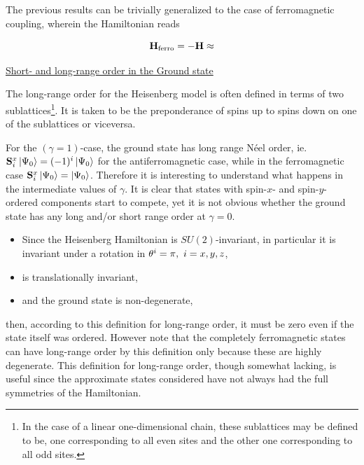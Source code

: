 \documentclass{homework}
\begin{document}
The previous results can be trivially generalized to the case of ferromagnetic coupling, wherein the Hamiltonian reads 

\begin{equation}
    {\bf H}_{\textnormal{ferro}} = - {\bf H} \approx 
\end{equation}


\underline{Short- and long-range order in the Ground state}

The long-range order for the Heisenberg model is often defined in terms of two sublattices\footnote{In the case of a linear one-dimensional chain, these sublattices may be defined to be, one corresponding to all even sites and the other one corresponding to all odd sites.}. It is taken to be the preponderance of spins up to spins down on one of the sublattices or viceversa.

\begin{tcolorbox}[colback = yellow, title = Physical Context]

For the $(\gamma=1)$-case, the ground state has long range Néel order, ie. ${\bf S}^x_i \ket{\Psi_0} = (-1)^i \ket{\Psi_0}$ for the antiferromagnetic case, while in the ferromagnetic case ${\bf S}^x_i \ket{\Psi_0} = \ket{\Psi_0}$. Therefore it is interesting to understand what happens in the intermediate values of $\gamma$. It is clear that states with spin-$x$- and spin-$y$-ordered components start to compete, yet it is not obvious whether the ground state has any long and/or short range order at $\gamma = 0$.

\end{tcolorbox}

\begin{itemize}
    \item Since the Heisenberg Hamiltonian is $SU(2)$-invariant, in particular it is invariant under a rotation in $\theta^{i} = \pi, \textnormal{ } i =x,y,z$,
    \item is translationally invariant,
    \item and the ground state is non-degenerate,
\end{itemize}

then, according to this definition for long-range order, it must be zero even if the state itself was ordered. However note that the completely ferromagnetic states can have long-range order by this definition only because these are highly degenerate. This definition for long-range order, though somewhat lacking, is useful since the approximate states considered have not always had the full symmetries of the Hamiltonian.\\
\end{document}
